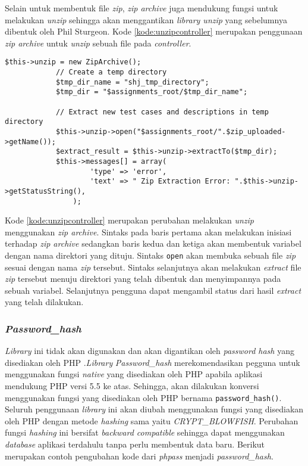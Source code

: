 Selain untuk membentuk file \textit{zip}, \textit{zip archive} juga mendukung fungsi untuk melakukan \textit{unzip} sehingga akan menggantikan \textit{library unzip} yang sebelumnya dibentuk oleh Phil Sturgeon. Kode \ref{kode:unzipcontroller} merupakan penggunaan \textit{zip archive} untuk \textit{unzip} sebuah file pada \textit{controller}.

\begin{lstlisting}[caption=Perancangan perubahan \textit{unzip} menggunakan \textit{zip archive} pada \textit{controller}, label=kode:unzipcontroller]
$this->unzip = new ZipArchive();
			// Create a temp directory
			$tmp_dir_name = "shj_tmp_directory";
			$tmp_dir = "$assignments_root/$tmp_dir_name";

			// Extract new test cases and descriptions in temp directory
			$this->unzip->open("$assignments_root/".$zip_uploaded->getName());
			$extract_result = $this->unzip->extractTo($tmp_dir);
			$this->messages[] = array(
					'type' => 'error',
					'text' => " Zip Extraction Error: ".$this->unzip->getStatusString(),
				);
\end{lstlisting}

Kode \ref{kode:unzipcontroller} merupakan perubahan melakukan \textit{unzip} menggunakan \textit{zip archive}. Sintaks pada baris pertama akan melakukan inisiasi terhadap \textit{zip archive} sedangkan baris kedua dan ketiga akan membentuk variabel dengan nama direktori yang dituju. Sintaks \texttt{open} akan membuka sebuah file \textit{zip} sesuai dengan nama \textit{zip} tersebut. Sintaks selanjutnya akan melakukan \textit{extract} file \textit{zip} tersebut menuju direktori yang telah dibentuk dan menyimpannya pada sebuah variabel. Selanjutnya pengguna dapat mengambil status dari hasil \textit{extract} yang telah dilakukan. 

\subsubsection{\textit{Password\_hash}}
\textit{Library} ini tidak akan digunakan dan akan digantikan oleh \textit{password hash} yang disediakan oleh PHP .\textit{Library} \textit{Password\_hash} merekomendasikan pegguna untuk menggunakan fungsi \textit{native} yang disediakan oleh PHP apabila aplikasi mendukung PHP versi 5.5 ke atas. Sehingga, akan dilakukan konversi menggunakan fungsi yang disediakan oleh PHP bernama \texttt{password\_hash()}. Seluruh penggunaan \textit{library} ini akan diubah menggunakan fungsi yang disediakan oleh PHP dengan metode \textit{hashing} sama yaitu \textit{CRYPT\_BLOWFISH}. Perubahan fungsi \textit{hashing} ini bersifat \textit{backward compatible} sehingga dapat menggunakan \textit{database} aplikasi terdahulu tanpa perlu membentuk data baru. Berikut merupakan contoh pengubahan kode dari \textit{phpass} menjadi \textit{password\_hash}.

